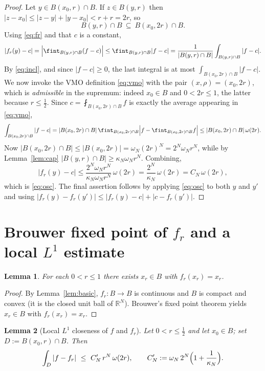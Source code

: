 \documentclass{amsart}
\newtheorem{lemma}{Lemma}
\theoremstyle{definition}
\begin{document}
\begin{proof}
Let $y\in B(x_0,r)\cap B$. If $z\in B(y,r)$ then
$|z-x_0|\le|z-y|+|y-x_0|<r+r=2r$, so
\begin{equation}\label{eq:incl}
B(y,r)\cap B\ \subseteq\ B(x_0,2r)\cap B.
\end{equation}
Using \eqref{eq:fr} and that $c$ is a constant,
\[
|f_r(y)-c|=\Bigl|\fint_{B(y,r)\cap B}(f-c)\Bigr|
\le\fint_{B(y,r)\cap B}|f-c|
=\frac{1}{|B(y,r)\cap B|}\int_{B(y,r)\cap B}|f-c|.
\]
By \eqref{eq:incl}, and since $|f-c|\ge0$, the last integral is at most
$\int_{B(x_0,2r)\cap B}|f-c|$. We now invoke the VMO definition \eqref{eq:vmo}
with the pair $(x,\rho)=(x_0,2r)$, which is \emph{admissible} in the supremum:
indeed $x_0\in B$ and $0<2r\le1$, the latter because $r\le\tfrac12$. Since
$c=\fint_{B(x_0,2r)\cap B}f$ is exactly the average appearing in \eqref{eq:vmo},
\[
\int_{B(x_0,2r)\cap B}|f-c|
=|B(x_0,2r)\cap B|\,\fint_{B(x_0,2r)\cap B}\Bigl|f-\fint_{B(x_0,2r)\cap B}f\Bigr|
\le |B(x_0,2r)\cap B|\,\omega(2r).
\]
Now $|B(x_0,2r)\cap B|\le|B(x_0,2r)|=\omega_N(2r)^N=2^N\omega_N r^N$, while by
Lemma~\ref{lem:cap} $|B(y,r)\cap B|\ge\kappa_N\omega_N r^N$. Combining,
\[
|f_r(y)-c|\le\frac{2^N\omega_N r^N}{\kappa_N\omega_N r^N}\,\omega(2r)
=\frac{2^N}{\kappa_N}\,\omega(2r)=C_N\,\omega(2r),
\]
which is \eqref{eq:osc}. The final assertion follows by applying \eqref{eq:osc} to
both $y$ and $y'$ and using $|f_r(y)-f_r(y')|\le|f_r(y)-c|+|c-f_r(y')|$.
\end{proof}

\section{Brouwer fixed point of $f_r$ and a local $L^1$ estimate}

\begin{lemma}\label{lem:brouwer}
For each $0<r\le1$ there exists $x_r\in B$ with $f_r(x_r)=x_r$.
\end{lemma}

\begin{proof}
By Lemma~\ref{lem:basic}, $f_r:B\to B$ is continuous and $B$ is compact and convex
(it is the closed unit ball of $\mathbb{R}^N$). Brouwer's fixed point theorem
yields $x_r\in B$ with $f_r(x_r)=x_r$.
\end{proof}

\begin{lemma}[Local $L^1$ closeness of $f$ and $f_r$]\label{lem:loc}
Let $0<r\le\tfrac12$ and let $x_0\in B$; set $D:=B(x_0,r)\cap B$. Then
\[
\int_{D}|f-f_r|\ \le\ C'_N\,r^N\,\omega(2r),
\qquad C'_N:=\omega_N\,2^N\Bigl(1+\frac1{\kappa_N}\Bigr).
\]
\end{lemma}
\end{document}
